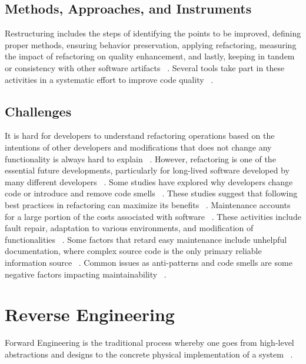 \subsection{Methods, Approaches, and Instruments} 

Restructuring includes the steps of identifying the points to be improved, defining proper methods, ensuring behavior preservation, applying refactoring, measuring the impact of refactoring on quality enhancement, and lastly, keeping in tandem or consistency with other software artifacts ~\cite{estructuringArnold1989}. Several tools take part in these activities in a systematic effort to improve code quality ~\cite{ManagingMaintenance1983}.

\subsection{Challenges} 

It is hard for developers to understand refactoring operations based on the intentions of other developers and modifications that does not change any functionality is always hard to explain ~\cite{smellsRefactoring2020}. However, refactoring is one of the essential future developments, particularly for long-lived software developed by many different developers ~\cite{smellsRefactoring2020}. Some studies have explored why developers change code or introduce and remove code smells ~\cite{30yearsSoftwareRefactoring2020}. These studies suggest that following best practices in refactoring can maximize its benefits ~\cite{30yearsSoftwareRefactoring2020}. Maintenance accounts for a large portion of the costs associated with software ~\cite{ManagingMaintenance1983}. These activities include fault repair, adaptation to various environments, and modification of functionalities ~\cite{ManagingMaintenance1983}. Some factors that retard easy maintenance include unhelpful documentation, where complex source code is the only primary reliable information source ~\cite{ManagingMaintenance1983}. Common issues as anti-patterns and code smells are some negative factors impacting maintainability ~\cite{smellsRefactoring2020}.

\section{Reverse Engineering}

Forward Engineering is the traditional process whereby one goes from high-level abstractions and designs to the concrete physical implementation of a system ~\cite{ReverseEngineering2005}.

